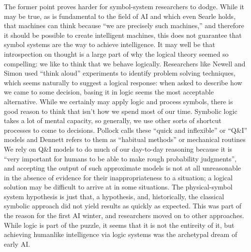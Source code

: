 The former point proves harder for symbol-system researchers to dodge.
While it may be true, as is 
fundamental to the field of AI and which even Searle holds, that
machines can think because ``we are precisely such machines,''\cite[p.
83]{chineseSearle} and therefore it should be possible to create
intelligent machines, this does not guarantee that symbol systems are
the way to achieve intelligence. It may well be that introspection on
thought is a large part of why the logical theory seemed so
compelling:  we like to think that we behave logically. Researchers like Newell
and Simon used ``think aloud'' experiments to identify problem solving
techniques,\cite[Ch. 10]{mccorduck} which seems naturally to suggest a
logical response:  when
asked to describe how we came to some decision, basing it in logic
seems the most acceptable alternative. While we certainly may apply logic
and process symbols, there is good reason to think that isn't how we
spend most of our time. Symbolic logic takes a lot of mental capacity,
so generally, we use other sorts of shortcut processes to come to
decisions. Pollock calls these ``quick and inflexible'' or ``Q\&I''
models\cite[p. 120]{pollock} and Dennett refers to them as ``habitual methods'' or
mechanical routines\cite[p. 157]{dennett} We rely on Q\&I models to do
much of our day-to-day reasoning because it is ``very important for
humans to be able to make rough probability judgments''\cite[p.
  120]{pollock}, and accepting the output of such approximate models
is not at all unreasonable in the absence of evidence for their
inappropriateness to a situation; a logical solution may be difficult
to arrive at in some situations. The physical-symbol system hypothesis
is just that, a hypothesis, and, historically, the classical symbolic
approach did not yield results as quickly as expected. This was part
of the reason for the first AI winter, and researchers moved on to
other approaches. While logic is part of the puzzle, it seems that it
is not the entireity of it, but achieving humanlike intelligence via logic
systems was the archetypal dream of early AI.

